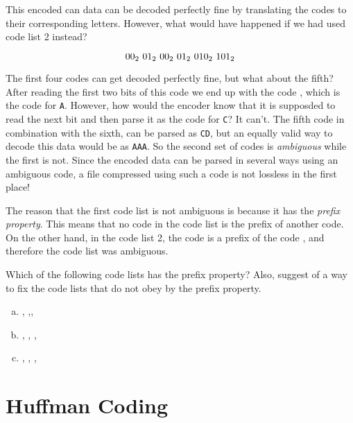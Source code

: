 This encoded can data can be decoded perfectly fine by translating the
codes to their corresponding letters. However, what would have
happened if we had used code list 2 instead?

\begin{equation*}
  \bin{00}\ \bin{01}\ \bin{00}\ \bin{01}\ \bin{010}\ \bin{101}
\end{equation*}

The first four codes can get decoded perfectly fine, but what about
the fifth? After reading the first two bits of this code we end up
with the code , which is the code for \texttt{A}. However, how
would the encoder know that it is supposded to read the next bit and
then parse it as the code for \texttt{C}? It can't. The fifth code in
combination with the sixth,  can be parsed as \texttt{CD},
but an equally valid way to decode this data would be as
\texttt{AAA}. So the second set of codes is \textit{ambiguous} while
the first is not. Since the encoded data can be parsed in several ways
using an ambiguous code, a file compressed using such a code is not
lossless in the first place!

The reason that the first code list is not ambiguous is because it has
the \textit{prefix property}. This means that no code in the code list
is the prefix of another code. On the other hand, in the code list 2,
the code  is a prefix of the code , and therefore the
code list was ambiguous.

\begin{Exercise}[label={prefix-prop}]

  Which of the following code lists has the prefix property?  Also,
  suggest of a way to fix the code lists that do not obey by the
  prefix property.

  \begin{enumerate}[(a)]
  \item {}, ,,

  \item {}, , , 

  \item {}, , , 

  \end{enumerate}

\end{Exercise}

\section{Huffman Coding}

